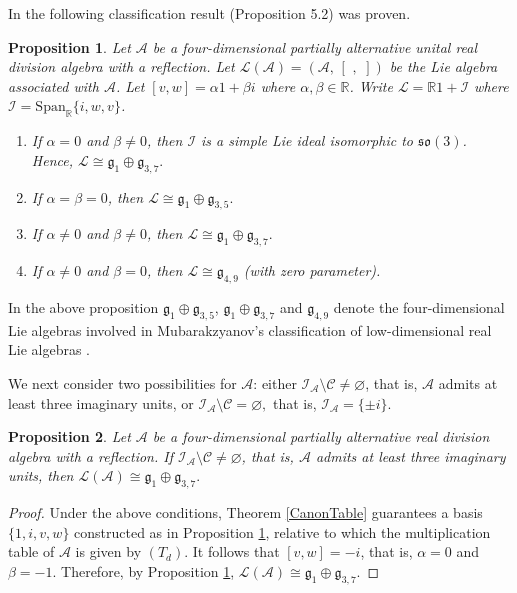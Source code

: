 \documentclass{amsart}
\theoremstyle{definition}
\theoremstyle{plain}
\newtheorem{proposition}{Proposition}
\begin{document}
In \cite{HNT} the following classification result (Proposition 5.2) was proven.

\begin{proposition} \label{Prop5.2}  Let $\mathcal A$ be a four-dimensional partially alternative unital real division algebra with a reflection.
Let $\mathcal L (\mathcal A) = (\mathcal A,\, [\,\,,\,\,])$ be the Lie algebra associated with $\mathcal A$. Let $[v, w]= \alpha 1+\beta i$ where
$\alpha, \beta \in  \mathbb R$.  Write $\mathcal L = \mathbb R 1 + \mathcal I$ where $\mathcal I = \text{Span}_{\mathbb R}\{i, w, v\}$.
\begin{enumerate}
\item If $\alpha=0$ and $\beta \neq 0$, then $\mathcal I$ is a simple Lie ideal isomorphic to $\mathfrak{so}(3)$. Hence,   $\mathcal L \cong \mathfrak{g}_1 \oplus \mathfrak g_{3,7}.$ 
\item If $\alpha=\beta=0$, then $\mathcal L\cong \mathfrak g_1 \oplus \mathfrak g_{3, 5}.$ 
\item If $\alpha \neq 0$ and $\beta \neq 0$, then  $\mathcal L  \cong \mathfrak{g}_1 \oplus \mathfrak g_{3,7}.$ 
\item  If $\alpha\neq 0$ and $\beta = 0$, then $\mathcal L \cong \mathfrak g_{4,9}$ (with zero parameter).
\end{enumerate}
\end{proposition}
\noindent In the above proposition $\mathfrak g_1 \oplus \mathfrak g_{3, 5}$, $ \mathfrak{g}_1 \oplus \mathfrak g_{3,7}$ and $\mathfrak g_{4,9}$ denote the four-dimensional Lie algebras involved in Mubarakzyanov's classification of low-dimensional real Lie algebras \cite{Mub}.
\par\medskip

We next consider two possibilities for $\mathcal A$: either  $\mathcal{I_A}\setminus\mathcal{C}\neq \varnothing$, that is, $\mathcal{A}$ admits at least three imaginary units, or
$\mathcal{I_A}\setminus\mathcal{C} = \varnothing,$ that is, $\mathcal{I_A} = \{\pm i\}$. 


\begin{proposition}\label{PropForMoreUnits}
Let $\mathcal{A}$ be a four-dimensional partially alternative real division algebra with a reflection. If $\mathcal{I_A}\setminus\mathcal{C}\neq \varnothing$, that is, $\mathcal{A}$ admits at least three imaginary units, then $ \mathcal L (\mathcal A)\cong  \mathfrak{g}_1 \oplus \mathfrak g_{3,7}.$
\end{proposition}
\begin{proof}
Under the above conditions, Theorem \ref{CanonTable} guarantees a basis $\{1, i, v, w\}$ constructed as in Proposition \ref{Prop5.2}, relative to which the multiplication table of $\mathcal A$ is given by $(T_d)$. It follows that 
$[v, w] = -i$, that is, $\alpha = 0$ and $\beta=-1$. Therefore, by Proposition \ref{Prop5.2},  $\mathcal{L}(\mathcal{A}) \cong \mathfrak{g}_1 \oplus \mathfrak g_{3,7}.$
\end{proof}
\end{document}
